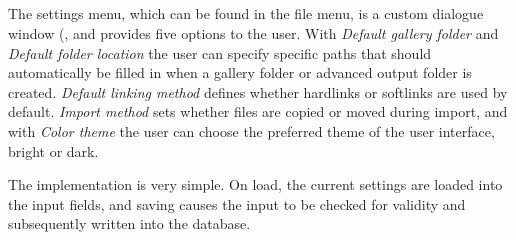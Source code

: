 \subsection{}
\def\kapitelautor{Erik Ritschl}

The settings menu, which can be found in the file menu, is a custom dialogue window (, and provides five options to the user. With \emph{Default gallery folder} and \emph{Default folder location} the user can specify specific paths that should automatically be filled in when a gallery folder or advanced output folder is created. \emph{Default linking method} defines whether hardlinks or softlinks are used by default. \emph{Import method} sets whether files are copied or moved during import, and with \emph{Color theme} the user can choose the preferred theme of the user interface, bright or dark.

The implementation is very simple. On load, the current settings are loaded into the input fields, and saving causes the input to be checked for validity and subsequently written into the database.